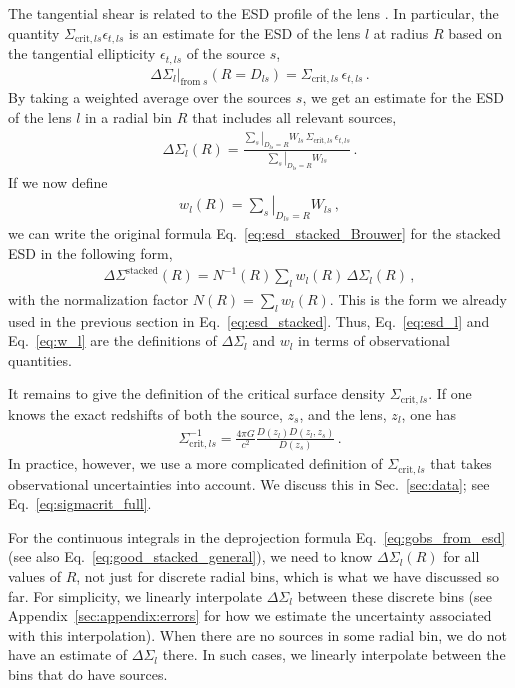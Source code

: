 \documentclass[a4paper,11pt]{article}
\begin{document}
The tangential shear is related to the ESD profile of the lens \citep{Bartelmann1995,Kaiser1995}.
In particular, the quantity $\Sigma_{\mathrm{crit},ls} \epsilon_{t,ls}$ is an estimate for the ESD of the lens $l$ at radius $R$ based on the tangential ellipticity $\epsilon_{t,ls}$ of the source $s$,
\begin{align}
 \left. \Delta \Sigma_l\right|_{\mathrm{from}\;s}(R = D_{ls}) = \Sigma_{\mathrm{crit},ls} \, \epsilon_{t,ls} \,.
\end{align}
By taking a weighted average over the sources $s$, we get an estimate for the ESD of the lens $l$ in a radial bin $R$ that includes all relevant sources,
\begin{align}
 \label{eq:esd_l}
 \Delta \Sigma_l(R) = \frac{\left.\sum_s\right|_{D_{ls} = R} W_{ls} \, \Sigma_{\mathrm{crit},ls} \, \epsilon_{t,ls}}{\left.\sum_s\right|_{D_{ls} = R} W_{ls}} \,.
\end{align}
If we now define
\begin{align}
 \label{eq:w_l}
 w_l(R) = \left.\sum_s\right|_{D_{ls} = R} W_{ls} \,,
\end{align}
we can write the original formula Eq.~\eqref{eq:esd_stacked_Brouwer} for the stacked ESD in the following form,
\begin{align}
 \Delta \Sigma^{\mathrm{stacked}}(R) = N^{-1}(R) \sum_l w_l(R) \, \Delta \Sigma_l(R) \,,
\end{align}
with the normalization factor $N(R) = \sum_l w_l(R)$.
This is the form we already used in the previous section in Eq.~\eqref{eq:esd_stacked}.
Thus, Eq.~\eqref{eq:esd_l} and Eq.~\eqref{eq:w_l} are the definitions of $\Delta \Sigma_l$ and $w_l$ in terms of observational quantities.

It remains to give the definition of the critical surface density $\Sigma_{\mathrm{crit},ls}$.
If one knows the exact redshifts of both the source, $z_s$, and the lens, $z_l$, one has
\begin{align}
 \Sigma^{-1}_{\mathrm{crit},ls} = \frac{4 \pi G}{c^2} \frac{D(z_l) D(z_l, z_s)}{D(z_s)} \,.
\end{align}
In practice, however, we use a more complicated definition of $\Sigma_{\mathrm{crit},ls}$ that takes observational uncertainties into account.
We discuss this in Sec.~\ref{sec:data}; see Eq.~\eqref{eq:sigmacrit_full}.

For the continuous integrals in the deprojection formula Eq.~\eqref{eq:gobs_from_esd} (see also Eq.~\eqref{eq:good_stacked_general}), we need to know $\Delta \Sigma_l(R)$ for all values of $R$, not just for discrete radial bins, which is what we have discussed so far.
For simplicity, we linearly interpolate $\Delta \Sigma_l$ between these discrete bins (see Appendix~\ref{sec:appendix:errors} for how we estimate the uncertainty associated with this interpolation).
When there are no sources in some radial bin, we do not have an estimate of $\Delta \Sigma_l$ there.
In such cases, we linearly interpolate between the bins that do have sources.
\end{document}

